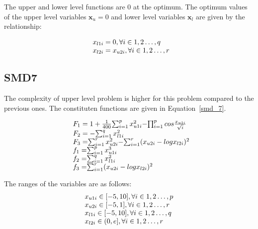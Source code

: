 The upper and lower level functions are 0 at the optimum. The optimum values of the upper level variables $\mathbf{x}_u=0$ and lower level variables $\mathbf{x}_l$ are given by the relationship: 

\begin{equation}
\begin{array}{lr}
\text{}\hspace{2mm} x_{l1i}=0,  \forall i \in {1,2\ldots,q} \\
\text{}\hspace{2mm} x_{l2i}=x_{u2i} ,  \forall i \in {1,2\ldots,r} \\
\end{array}
\label{basic_6}
\end{equation}


\subsection{SMD7}

The complexity of upper level problem is higher for this problem compared to the previous ones. The constituten functions are given in Equation~\ref{smd_7}.

\begin{equation}
\begin{array}{lr}
\text{}\hspace{2mm} F_1=1+\frac{1}{400}$$\sum_{i=1}^{p} x_{u1i}^{2} $$-$$\prod_{i=1}^{p} cos \frac{x_{u1i}}{\sqrt{i}} $$\\
\text{}\hspace{2mm} F_2=-$$\sum_{	i=1}^{q} x_{l1i}^{2} $$\\
\text{}\hspace{2mm} F_3=$$\sum_{	i=1}^{r} x_{u2i}^{2} $$-$$\sum_{	i=1}^{r} (x_{u2i}-log x_{l2i})^{2} $$\\


\text{}\hspace{2mm} f_1=$$\sum_{	i=1}^{p} x_{u1i}^{3} $$\\
\text{}\hspace{2mm} f_2=$$\sum_{	i=1}^{q} x_{l1i}^{2} $$\\
\text{}\hspace{2mm} f_3=$$\sum_{	i=1}^{r} (x_{u2i}-log x_{l2i})^{2} $$\\

\end{array}
\label{smd_7}
\end{equation}


The ranges of the variables are as follows:
\begin{equation}
\begin{array}{lr}
$$x_{u1i} \in  [-5,10],          \forall i \in {1,2\ldots,p}$$\\
$$x_{u2i} \in  [-5,1],          \forall i \in {1,2\ldots,r}$$\\
$$x_{l1i} \in  [-5,10],          \forall i \in {1,2\ldots,q}$$\\
$$x_{l2i} \in  (0,e],          \forall i \in {1,2\ldots,r}$$
\end{array}
\label{smd_7_sub}
\end{equation}

